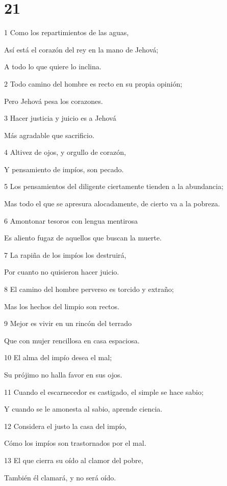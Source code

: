 \chapter{21}

\par 1 Como los repartimientos de las aguas,
\par Así está el corazón del rey en la mano de Jehová;
\par A todo lo que quiere lo inclina.
\par 2 Todo camino del hombre es recto en su propia opinión;
\par Pero Jehová pesa los corazones.
\par 3 Hacer justicia y juicio es a Jehová
\par Más agradable que sacrificio.
\par 4 Altivez de ojos, y orgullo de corazón,
\par Y pensamiento de impíos, son pecado.
\par 5 Los pensamientos del diligente ciertamente tienden a la abundancia;
\par Mas todo el que se apresura alocadamente, de cierto va a la pobreza.
\par 6 Amontonar tesoros con lengua mentirosa
\par Es aliento fugaz de aquellos que buscan la muerte.
\par 7 La rapiña de los impíos los destruirá, 
\par Por cuanto no quisieron hacer juicio.
\par 8 El camino del hombre perverso es torcido y extraño;
\par Mas los hechos del limpio son rectos.
\par 9 Mejor es vivir en un rincón del terrado
\par Que con mujer rencillosa en casa espaciosa.
\par 10 El alma del impío desea el mal;
\par Su prójimo no halla favor en sus ojos.
\par 11 Cuando el escarnecedor es castigado, el simple se hace sabio;
\par Y cuando se le amonesta al sabio, aprende ciencia.
\par 12 Considera el justo la casa del impío,
\par Cómo los impíos son trastornados por el mal.
\par 13 El que cierra su oído al clamor del pobre,
\par También él clamará, y no será oído.

